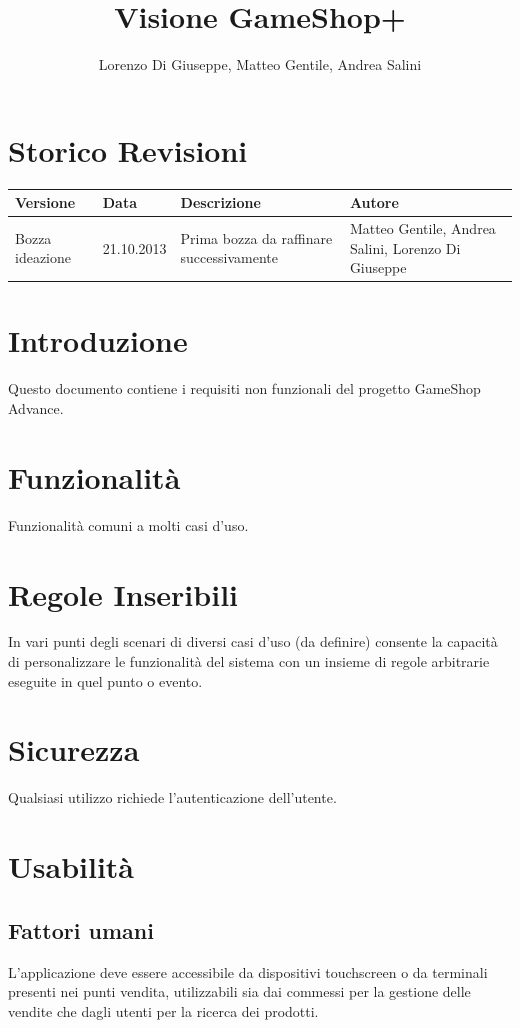 \documentclass[a4paper,10pt]{report}
\title{Visione GameShop+}
\author{Lorenzo Di Giuseppe, Matteo Gentile, Andrea Salini}
\begin{document}
  \maketitle

  
  \section*{Storico Revisioni}
  \begin{center}
    \begin{tabular}{|p{} p{} p{} p{}|}
      \hline
      \textbf{Versione} & \textbf{Data} & \textbf{Descrizione} & \textbf{Autore}\\
      \hline
      Bozza ideazione & 21.10.2013 & Prima bozza da raffinare
      successivamente & Matteo Gentile, Andrea Salini, Lorenzo Di Giuseppe\\
      \hline
    \end{tabular}
  \end{center}

  
  \section*{Introduzione}
  Questo documento contiene i requisiti non funzionali del progetto GameShop Advance.

  \section*{Funzionalità}
Funzionalità comuni a molti casi d'uso.

 \section*{Regole Inseribili}
In vari punti degli scenari di diversi casi d’uso (da definire) consente la capacità di personalizzare le funzionalità del sistema con un insieme di regole arbitrarie eseguite in quel punto o evento.

 \section*{Sicurezza}
Qualsiasi utilizzo richiede l’autenticazione dell’utente.

 \section*{Usabilità}
 \subsection*{Fattori umani}
L'applicazione deve essere accessibile da dispositivi touchscreen o da terminali presenti nei punti vendita, utilizzabili sia dai commessi per la gestione delle vendite che dagli utenti per la ricerca dei prodotti.
\end{document}
